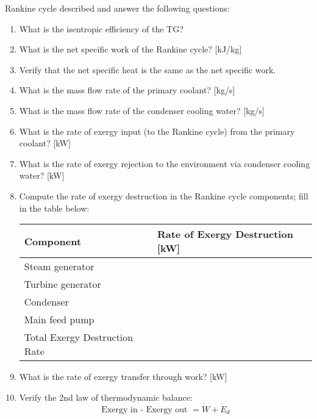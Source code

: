 Rankine cycle described and answer the following questions:
\begin{fullwidth}
\begin{enumerate}
\item What is the isentropic efficiency of the TG?
\vspace{1.0cm}
\item What is the net specific work of the Rankine cycle? [kJ/kg]
\vspace{1.0cm}
\item Verify that the net specific heat is the same as the net specific work.
\vspace{1.0cm}
\item What is the mass flow rate of the primary coolant? [kg/s]
\vspace{1.0cm}
\item What is the mass flow rate of the condenser cooling water? [kg/s]
\vspace{1.0cm}
\item What is the rate of exergy input (to the Rankine cycle) from the primary coolant? [kW]
\vspace{1.0cm}
\item What is the rate of exergy rejection to the environment via condenser cooling water? [kW]
\vspace{1.0cm}
\item Compute the rate of exergy destruction in the Rankine cycle components; fill in the table below:
\begin{table}
\begin{tabular}{l | l}
\toprule
\textbf{Component} & \textbf{Rate of Exergy Destruction [kW]} \\
\hline
Steam generator &  \\
\hline
Turbine generator & \\
\hline
Condenser & \\
\hline
Main feed pump & \\
\hline
\hline
Total Exergy Destruction Rate & \\
\bottomrule
\end{tabular}
\end{table}

\vspace{1.0cm} 

\item What is the rate of exergy transfer through work? [kW]

\vspace{1.0cm}

\item Verify the 2nd law of thermodynamic balance:
$$\text{Exergy in - Exergy out } = \dot{W} + \dot{E}_{d}$$


\end{enumerate}
\end{fullwidth}
